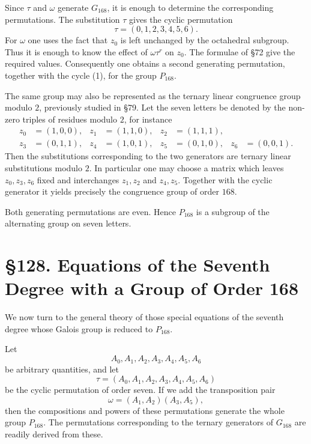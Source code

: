 \documentclass[11pt,a4paper]{book}
\newcommand{\webersection}[2]{\clearpage\section*{\S #1. #2}}
\begin{document}
Since \(\tau\) and \(\omega\) generate \(G_{168}\), it is enough to determine the corresponding permutations.  The substitution \(\tau\) gives the cyclic permutation
\begin{equation}
 \tau=(0,1,2,3,4,5,6). \tag{1}
\end{equation}
For \(\omega\) one uses the fact that \(z_0\) is left unchanged by the octahedral subgroup.  Thus it is enough to know the effect of \(\omega\tau^r\) on \(z_0\).  The formulae of \S 72 give the required values.  Consequently one obtains a second generating permutation, together with the cycle (1), for the group \(P_{168}\).

The same group may also be represented as the ternary linear congruence group modulo \(2\), previously studied in \S 79.  Let the seven letters be denoted by the non-zero triples of residues modulo \(2\), for instance
\begin{align*}
 z_0&=(1,0,0), & z_1&=(1,1,0), & z_2&=(1,1,1),\\
 z_3&=(0,1,1), & z_4&=(1,0,1), & z_5&=(0,1,0), & z_6&=(0,0,1).
\end{align*}
Then the substitutions corresponding to the two generators are ternary linear substitutions modulo \(2\).  In particular one may choose a matrix which leaves \(z_0,z_3,z_6\) fixed and interchanges \(z_1,z_2\) and \(z_4,z_5\).  Together with the cyclic generator it yields precisely the congruence group of order \(168\).

Both generating permutations are even.  Hence \(P_{168}\) is a subgroup of the alternating group on seven letters.

\webersection{128}{Equations of the Seventh Degree with a Group of Order 168}

We now turn to the general theory of those special equations of the seventh degree whose Galois group is reduced to \(P_{168}\).

Let
\[
 A_0,A_1,A_2,A_3,A_4,A_5,A_6
\]
be arbitrary quantities, and let
\begin{equation}
 \tau=(A_0,A_1,A_2,A_3,A_4,A_5,A_6) \tag{1}
\end{equation}
be the cyclic permutation of order seven.  If we add the transposition pair
\begin{equation}
 \omega=(A_1,A_2)(A_3,A_5), \tag{2}
\end{equation}
then the compositions and powers of these permutations generate the whole group \(P_{168}\).  The permutations corresponding to the ternary generators of \(G_{168}\) are readily derived from these.
\end{document}

